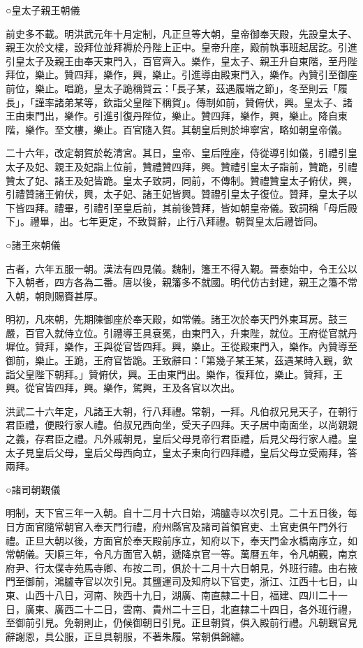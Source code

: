 ○皇太子親王朝儀

前史多不載。明洪武元年十月定制，凡正旦等大朝，皇帝御奉天殿，先設皇太子、親王次於文樓，設拜位並拜褥於丹陛上正中。皇帝升座，殿前執事班起居訖。引進引皇太子及親王由奉天東門入，百官齊入。樂作，皇太子、親王升自東階，至丹陛拜位，樂止。贊四拜，樂作，興，樂止。引進導由殿東門入，樂作。內贊引至御座前位，樂止。唱跪，皇太子跪稱賀云：「長子某，茲遇履端之節」，冬至則云「履長」，「謹率諸弟某等，欽詣父皇陛下稱賀」。傳制如前，贊俯伏，興。皇太子、諸王由東門出，樂作。引進引復丹陛位，樂止。贊四拜，樂作，興，樂止。降自東階，樂作。至文樓，樂止。百官隨入賀。其朝皇后則於坤寧宮，略如朝皇帝儀。

二十六年，改定朝賀於乾清宮。其日，皇帝、皇后陞座，侍從導引如儀，引禮引皇太子及妃、親王及妃詣上位前，贊禮贊四拜，興。贊禮引皇太子詣前，贊跪，引禮贊太了妃、諸王及妃皆跪。皇太子致詞，同前，不傳制。贊禮贊皇太子俯伏，興，引禮贊諸王俯伏，興，太子妃、諸王妃皆興。贊禮引皇太子復位。贊拜，皇太子以下皆四拜。禮畢，引禮引至皇后前，其前後贊拜，皆如朝皇帝儀。致詞稱「母后殿下」。禮畢，出。七年更定，不致賀辭，止行八拜禮。朝賀皇太后禮皆同。

○諸王來朝儀

古者，六年五服一朝。漢法有四見儀。魏制，籓王不得入覲。晉泰始中，令王公以下入朝者，四方各為二番。唐以後，親籓多不就國。明代仿古封建，親王之籓不常入朝，朝則賜賚甚厚。

明初，凡來朝，先期陳御座於奉天殿，如常儀。諸王次於奉天門外東耳房。鼓三嚴，百官入就侍立位。引禮導王具袞冕，由東門入，升東陛，就位。王府從官就丹墀位。贊拜，樂作，王與從官皆四拜。興，樂止。王從殿東門入，樂作。內贊導至御前，樂止。王跪，王府官皆跪。王致辭曰：「第幾子某王某，茲遇某時入覲，欽詣父皇陛下朝拜。」贊俯伏，興。王由東門出。樂作，復拜位，樂止。贊拜，王興。從官皆四拜，興。樂作，駕興，王及各官以次出。

洪武二十六年定，凡諸王大朝，行八拜禮。常朝，一拜。凡伯叔兄見天子，在朝行君臣禮，便殿行家人禮。伯叔兄西向坐，受天子四拜。天子居中南面坐，以尚親親之義，存君臣之禮。凡外戚朝見，皇后父母見帝行君臣禮，后見父母行家人禮。皇太子見皇后父母，皇后父母西向立，皇太子東向行四拜禮，皇后父母立受兩拜，答兩拜。

○諸司朝覲儀

明制，天下官三年一入朝。自十二月十六日始，鴻臚寺以次引見。二十五日後，每日方面官隨常朝官入奉天門行禮，府州縣官及諸司首領官吏、土官吏俱午門外行禮。正旦大朝以後，方面官於奉天殿前序立，知府以下，奉天門金水橋南序立，如常朝儀。天順三年，令凡方面官入朝，遞降京官一等。萬曆五年，令凡朝覲，南京府尹、行太僕寺苑馬寺卿、布按二司，俱於十二月十六日朝見，外班行禮。由右掖門至御前，鴻臚寺官以次引見。其鹽運司及知府以下官吏，浙江、江西十七日，山東、山西十八日，河南、陜西十九日，湖廣、南直隸二十日，福建、四川二十一日，廣東、廣西二十二日，雲南、貴州二十三日，北直隸二十四日，各外班行禮，至御前引見。免朝則止，仍候御朝日引見。正旦朝賀，俱入殿前行禮。凡朝覲官見辭謝恩，具公服，正旦具朝服，不著朱履。常朝俱錦繡。

